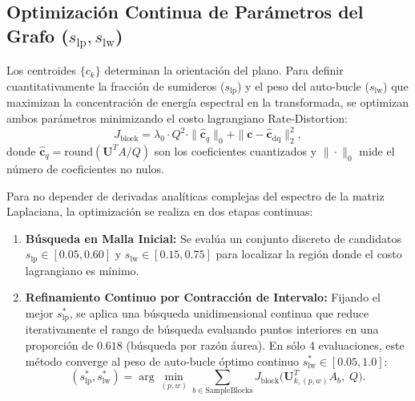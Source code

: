 \documentclass[11pt,a4paper]{article}
\begin{document}
\subsection{Optimización Continua de Parámetros del Grafo ($s_{\text{lp}}, s_{\text{lw}}$)}
Los centroides $\{c_k\}$ determinan la orientación del plano. Para definir cuantitativamente la fracción de sumideros ($s_{\text{lp}}$) y el peso del auto-bucle ($s_{\text{lw}}$) que maximizan la concentración de energía espectral en la transformada, se optimizan ambos parámetros minimizando el costo lagrangiano Rate-Distortion:
\begin{equation}
  J_{\text{block}} = \lambda_0 \cdot Q^2 \cdot \|\hat{\mathbf{c}}_q\|_0 + \|\mathbf{c} - \hat{\mathbf{c}}_{\text{dq}}\|_2^2,
\end{equation}
donde $\hat{\mathbf{c}}_q = \text{round}(\mathbf{U}^T A / Q)$ son los coeficientes cuantizados y $\|\cdot\|_0$ mide el número de coeficientes no nulos.

Para no depender de derivadas analíticas complejas del espectro de la matriz Laplaciana, la optimización se realiza en dos etapas continuas:
\begin{enumerate}
  \item \textbf{Búsqueda en Malla Inicial:} Se evalúa un conjunto discreto de candidatos $s_{\text{lp}} \in [0.05, 0.60]$ y $s_{\text{lw}} \in [0.15, 0.75]$ para localizar la región donde el costo lagrangiano es mínimo.
  \item \textbf{Refinamiento Continuo por Contracción de Intervalo:} Fijando el mejor $s_{\text{lp}}^*$, se aplica una búsqueda unidimensional continua que reduce iterativamente el rango de búsqueda evaluando puntos interiores en una proporción de $0.618$ (búsqueda por razón áurea). En sólo 4 evaluaciones, este método converge al peso de auto-bucle óptimo continuo $s_{\text{lw}}^* \in [0.05, 1.0]$:
  \begin{equation}
    (s_{\text{lp}}^*, s_{\text{lw}}^*) = \arg\min_{(p, w)} \sum_{b \in \text{SampleBlocks}} J_{\text{block}}\Big(\mathbf{U}_{k,(p,w)}^T A_b, \; Q\Big).
  \end{equation}
\end{enumerate}
\end{document}
